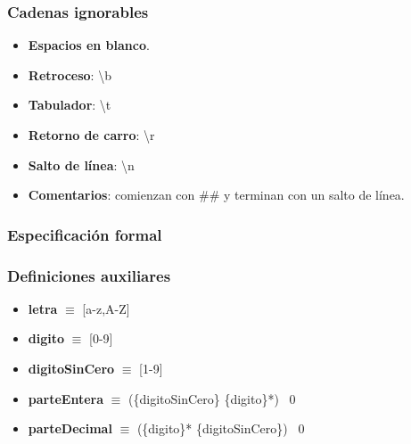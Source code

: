 \documentclass[11pt]{article}
\begin{document}
        \subsubsection*{Cadenas ignorables}
        \begin{itemize}
            \item \textbf{Espacios en blanco}.
            \item \textbf{Retroceso}: \textbackslash b
            \item \textbf{Tabulador}: \textbackslash t
            \item \textbf{Retorno de carro}: \textbackslash r
            \item \textbf{Salto de línea}: \textbackslash n
            \item \textbf{Comentarios}: comienzan con \#\# y terminan con un salto de línea.
        \end{itemize}
        \subsubsection{Especificación formal}
        \subsubsection*{Definiciones auxiliares}
        \begin{itemize}
            \item \textbf{letra }$\equiv$ [a-z,A-Z]
            \item \textbf{digito }$\equiv$ [0-9]
            \item \textbf{digitoSinCero }$\equiv$ [1-9]
            \item \textbf{parteEntera }$\equiv$ (\{digitoSinCero\} \{digito\}*) \textbar\ 0
            \item \textbf{parteDecimal }$\equiv$ (\{digito\}* \{digitoSinCero\}) \textbar\ 0
        \end{itemize}
\end{document}
